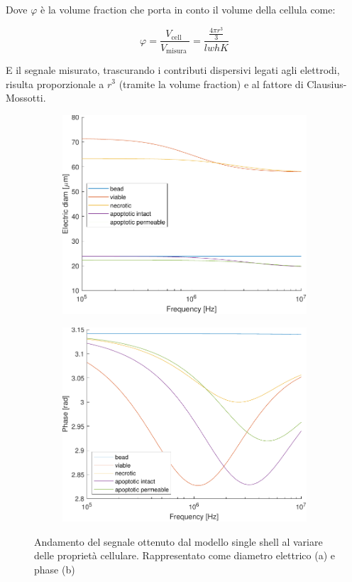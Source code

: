 Dove $\varphi$ è la volume fraction che porta in conto il volume della cellula come:

\begin{equation}
	\varphi=\frac{V_{\text {cell }}}{V_{\text {misura }}}=\frac{\frac{4 \pi r^{3}}{3}}{l w h K}
\end{equation}

E il segnale misurato, trascurando i contributi dispersivi legati agli elettrodi, risulta proporzionale a $r^3$ (tramite la volume fraction) e al fattore di Clausius-Mossotti.





\begin{figure}[t!]
	\begin{subfigure}{0.5\linewidth}
		\centering
		\includegraphics[width=0.95\linewidth]{../code/figs/diam}
		\caption{}
		\label{fig:diam}
	\end{subfigure}\hfill
	\begin{subfigure}{0.5\linewidth}
		\centering
		\includegraphics[width=0.95\linewidth]{../code/figs/phase}
		\caption{}
		\label{fig:phase}
	\end{subfigure}
	\caption{Andamento del segnale ottenuto dal modello single shell al variare delle proprietà cellulare. Rappresentato come diametro elettrico (a) e phase (b)}
	\label{fig:risultati}
\end{figure}

